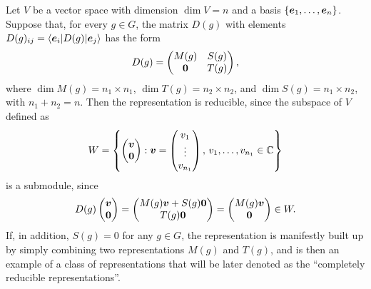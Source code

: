 \begin{ex}
    Let $V$ be a vector space with dimension $\dim{V} = n$ and a basis $\{\bm{e}_1,\dots,\bm{e}_n\}$. Suppose that, for every $g \in G$, the matrix $D(g)$ with elements $D(g)_{ij} = \langle \bm{e}_i | D(g) | \bm{e}_j \rangle$ has the form 
    \begin{equation}
        D(g) = 
        \begin{pmatrix}
            M(g) & S(g) \\
            \bm{0} & T(g)
        \end{pmatrix},
    \end{equation}
    where $\dim{M(g)} = n_1 \times n_1$, $\dim{T(g)} = n_2 \times n_2$, and $\dim{S(g)} = n_1 \times n_2$, with $n_1 + n_2 = n$. Then the representation is reducible, since the subspace of $V$ defined as 
    \begin{equation}
        W = \left\{
        \begin{pmatrix}
            \bm{v} \\
            \bm{0}
        \end{pmatrix} : \bm{v} = 
        \begin{pmatrix}
            v_1 \\
            \vdots \\
            v_{n_1}
        \end{pmatrix},\, v_1,\dots,v_{n_1} \in \mathbb{C} \right\}
    \end{equation}
    is a submodule, since
    \begin{equation}
        D(g)\begin{pmatrix}
            \bm{v} \\
            \bm{0}
        \end{pmatrix} = 
        \begin{pmatrix}
            M(g)\bm{v} + S(g)\bm{0} \\
            T(g)\bm{0}
        \end{pmatrix} =
        \begin{pmatrix}
            M(g)\bm{v} \\
            \bm{0}
        \end{pmatrix} \in W.
    \end{equation}
    If, in addition, $S(g) = 0$ for any $g \in G$, the representation is manifestly built up by simply combining two representations $M(g)$ and $T(g)$, and is then an example of a class of representations that will be later denoted as the ``completely reducible representations''. 
\end{ex}

